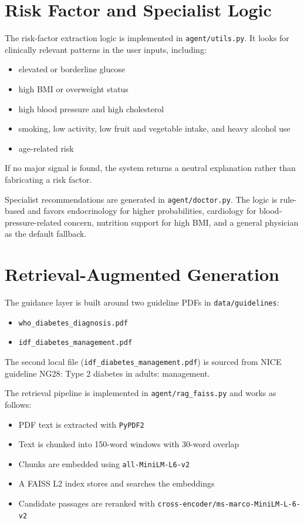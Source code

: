 \documentclass[12pt]{article}
\begin{document}
\section{Risk Factor and Specialist Logic}

The risk-factor extraction logic is implemented in \texttt{agent/utils.py}. It looks for clinically relevant patterns in the user inputs, including:

\begin{itemize}
\item elevated or borderline glucose
\item high BMI or overweight status
\item high blood pressure and high cholesterol
\item smoking, low activity, low fruit and vegetable intake, and heavy alcohol use
\item age-related risk
\end{itemize}

If no major signal is found, the system returns a neutral explanation rather than fabricating a risk factor.

Specialist recommendations are generated in \texttt{agent/doctor.py}. The logic is rule-based and favors endocrinology for higher probabilities, cardiology for blood-pressure-related concern, nutrition support for high BMI, and a general physician as the default fallback.

\section{Retrieval-Augmented Generation}

The guidance layer is built around two guideline PDFs in \texttt{data/guidelines}:

\begin{itemize}
\item \texttt{who\_diabetes\_diagnosis.pdf}
\item \texttt{idf\_diabetes\_management.pdf}
\end{itemize}

The second local file (\texttt{idf\_diabetes\_management.pdf}) is sourced from NICE guideline NG28: Type 2 diabetes in adults: management.

The retrieval pipeline is implemented in \texttt{agent/rag\_faiss.py} and works as follows:

\begin{itemize}
\item PDF text is extracted with \texttt{PyPDF2}
\item Text is chunked into 150-word windows with 30-word overlap
\item Chunks are embedded using \texttt{all-MiniLM-L6-v2}
\item A FAISS L2 index stores and searches the embeddings
\item Candidate passages are reranked with \texttt{cross-encoder/ms-marco-MiniLM-L-6-v2}
\end{itemize}
\end{document}
